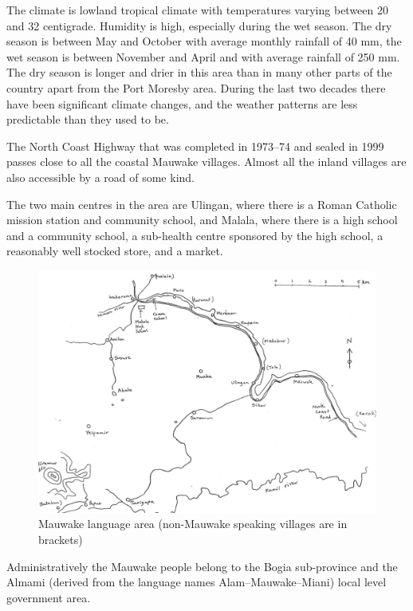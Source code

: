 The climate is lowland tropical climate with temperatures varying between 20{\textdegree} and 32{\textdegree} centigrade. Humidity is high, especially during the wet season.  The dry season is between May and October with average monthly rainfall of 40 mm, the wet season is between November and April and with average rainfall of 250 mm. The dry season is longer and drier in this area than in many other parts of the country apart from the Port Moresby area. During the last two decades there have been significant climate changes, and the weather patterns are less predictable than they used to be.

The North Coast Highway that was completed in 1973--74 and sealed in 1999 passes close to all the coastal Mauwake villages.  Almost all the inland villages are also accessible by a road of some kind. 

The two main centres in the area are Ulingan, where there is a Roman Catholic mission station and community school, and Malala, where there is a high school and a community school, a sub-health centre sponsored by the high school, a reasonably well stocked store, and a market.


\begin{figure}
\caption{Mauwake language area (non-Mauwake speaking villages are in brackets)}
\label{map:1:laguagearea}
\includegraphics[width=\textwidth]{figures/1-mauwake_language_area_map.jpeg}
\end{figure}

Administratively the Mauwake people belong to the Bogia sub-province and the Almami (derived from the language names Alam--Mauwake--Miani) local level government area. 

